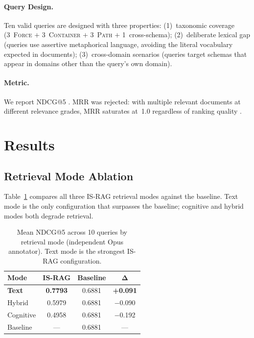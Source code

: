 \documentclass[11pt,a4paper]{article}
\begin{document}
\paragraph{Query Design.}
Ten valid queries are designed with three properties:
(1)~taxonomic coverage (3~\textsc{Force} $+$ 3~\textsc{Container} $+$
3~\textsc{Path} $+$ 1~cross-schema);
(2)~deliberate lexical gap (queries use assertive metaphorical
language, avoiding the literal vocabulary expected in documents);
(3)~cross-domain scenarios (queries target schemas that appear in
domains other than the query's own domain).

\paragraph{Metric.}
We report NDCG@5 \citep{jarvelin2002}.
MRR was rejected: with multiple relevant documents at different
relevance grades, MRR saturates at~1.0 regardless of ranking quality
\citep{buckley2004}.

\section{Results}
\label{sec:results}

\subsection{Retrieval Mode Ablation}
\label{sec:ablation}

Table~\ref{tab:modes} compares all three IS-RAG retrieval modes against
the baseline.
Text mode is the only configuration that surpasses the baseline;
cognitive and hybrid modes both degrade retrieval.

\begin{table}[h]
\centering
\small
\setlength{\tabcolsep}{6pt}
\begin{tabular}{lccc}
\toprule
\textbf{Mode} & \textbf{IS-RAG} & \textbf{Baseline} & $\boldsymbol{\Delta}$ \\
\midrule
\textbf{Text}  & \textbf{0.7793} & 0.6881 & \textbf{+0.091} \\
Hybrid         & 0.5979          & 0.6881 & $-$0.090 \\
Cognitive      & 0.4958          & 0.6881 & $-$0.192 \\
\midrule
Baseline       & —               & 0.6881 & — \\
\bottomrule
\end{tabular}
\caption{Mean NDCG@5 across 10 queries by retrieval mode
  (independent Opus annotator).
  Text mode is the strongest IS-RAG configuration.}
\label{tab:modes}
\end{table}
\end{document}
